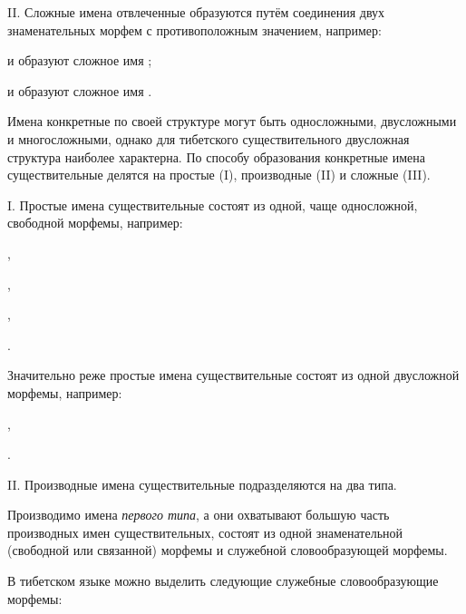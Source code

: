 II. Сложные имена отвлеченные образуются путём соединения двух знаменательных морфем с противоположным значением, например:
\begin{prfsample}
    \item {} и  образуют сложное имя ;
    \item {} и  образуют сложное имя .    
\end{prfsample}

Имена конкретные по своей структуре могут быть односложными, двусложными и многосложными, однако для тибетского существительного двусложная структура наиболее характерна. По способу образования конкретные имена существительные делятся на простые (I), производные (II) и сложные (III).

I. Простые имена существительные состоят из одной, чаще односложной, свободной морфемы, например:
\begin{prfsample}
    \item {},
    \item {},
    \item {},
    \item {}.    
\end{prfsample}
Значительно реже простые имена существительные состоят из одной двусложной морфемы, например:
\begin{prfsample}
    \item {},
    \item {}.   
\end{prfsample}

II. Производные имена существительные подразделяются на два типа.

Производимо имена \emph{первого типа}, а они охватывают большую часть производных имен существительных, состоят из одной знаменательной (свободной или связанной) морфемы и служебной словообразующей морфемы.

В тибетском языке можно выделить следующие служебные словообразующие морфемы:

